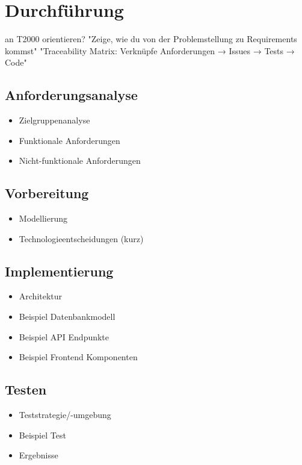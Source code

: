 \chapter{Durchführung}
an T2000 orientieren?
  "Zeige, wie du von der Problemstellung zu Requirements kommst"
  "Traceability Matrix: Verknüpfe Anforderungen → Issues → Tests → Code"
\section{Anforderungsanalyse}
\begin{itemize}
    \item Zielgruppenanalyse
    \item Funktionale Anforderungen
    \item Nicht-funktionale Anforderungen
\end{itemize}
\section{Vorbereitung}
\begin{itemize}
    \item Modellierung
    \item Technologieentscheidungen (kurz)
\end{itemize}
\section{Implementierung}
\begin{itemize}
    \item Architektur
    \item Beispiel Datenbankmodell
    \item Beispiel API Endpunkte
    \item Beispiel Frontend Komponenten
\end{itemize}
\section{Testen}
\begin{itemize}
    \item Teststrategie/-umgebung
    \item Beispiel Test
    \item Ergebnisse
\end{itemize}
